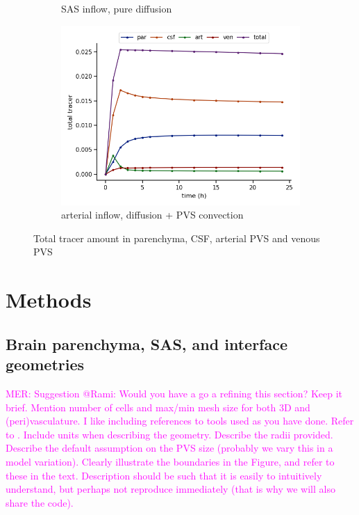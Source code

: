 \documentclass[fleqn,10pt]{wlscirep}
\newcommand{\mer}[1]{\textcolor{magenta}{#1}}
\begin{document}
\begin{figure}
\begin{subfigure}[b]{0.33\textwidth}
         \caption{SAS inflow, pure diffusion}
         \label{fig:three sin x}
     \end{subfigure}
     \hfill
     \begin{subfigure}[b]{0.33\textwidth}
         \centering
         \includegraphics[width=\textwidth]{modelC_total_conc.png}
         \caption{arterial inflow, diffusion + PVS convection}
         \label{fig:five over x}
     \end{subfigure}
        \caption{Total tracer amount in parenchyma, CSF, arterial PVS and venous PVS}
        \label{fig:three graphs}
\end{figure}

\fi

\newpage
\section*{Methods}


\subsection*{Brain parenchyma, SAS, and interface geometries}

\mer{MER: Suggestion @Rami: Would you have a go a refining this section? Keep it brief. Mention number of cells and max/min mesh size for both 3D and (peri)vasculature. I like including references to tools used as you have done. Refer to \Cref{fig:concept}. Include units when describing the geometry. Describe the radii provided. Describe the default assumption on the PVS size (probably we vary this in a model variation). Clearly illustrate the boundaries in the Figure, and refer to these in the text. Description should be such that it is easily to intuitively understand, but perhaps not reproduce immediately (that is why we will also share the code). }  
\end{document}
